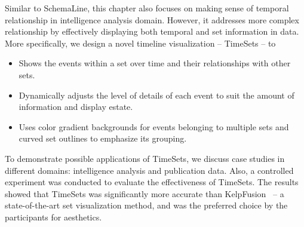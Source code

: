 Similar to SchemaLine, this chapter also focuses on making sense of temporal relationship in intelligence analysis domain. However, it addresses more complex relationship by effectively displaying both temporal and set information in data. More specifically, we design a novel timeline visualization -- TimeSets -- to

\begin{itemize}
	\item Shows the events within a set over time and their relationships with other sets.
	\item Dynamically adjusts the level of details of each event to suit the amount of information and display estate.
	\item Uses color gradient backgrounds for events belonging to multiple sets and curved set outlines to emphasize its grouping.
\end{itemize}

To demonstrate possible applications of TimeSets, we discuss case studies in different domains: intelligence analysis and publication data. Also, a controlled experiment was conducted to evaluate the effectiveness of TimeSets. The results showed that TimeSets was significantly more accurate than KelpFusion~\cite{Meulemans2013} -- a state-of-the-art set visualization method, and was the preferred choice by the participants for aesthetics.
